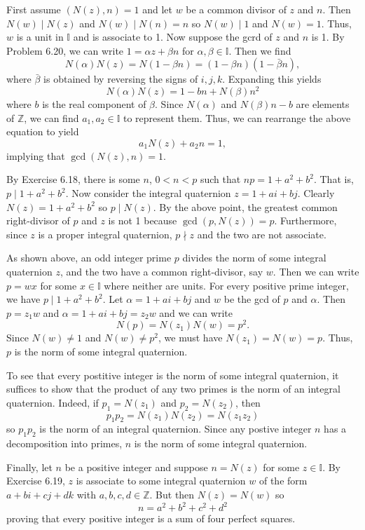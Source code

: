\documentclass[../../master.tex]{subfiles}
\begin{document}
\begin{solution}
    First assume $(N(z), n) = 1$ and let $w$ be a common divisor of $z$ and $n$.
    Then $N(w) \mid N(z)$ and $N(w) \mid N(n) = n$ so $N(w) \mid 1$ and $N(w) = 1$.
    Thus, $w$ is a unit in $\mathbb{I}$ and is associate to 1.
    Now suppose the gcrd of $z$ and $n$ is 1.
    By Problem 6.20, we can write $1 = \alpha z + \beta n$ for $\alpha, \beta \in \mathbb{I}$.
    Then we find
    \[
        N(\alpha) N(z) = N(1 - \beta n) = (1 - \beta n) (1 - \bar{\beta} n),
    \]
    where $\bar{\beta}$ is obtained by reversing the signs of $i, j, k$.
    Expanding this yields
    \[
        N(\alpha) N(z) = 1 - bn + N(\beta) n^2
    \]
    where $b$ is the real component of $\beta$.
    Since $N(\alpha)$ and $N(\beta) n - b$ are elements of $\mathbb{Z}$, we can find $a_1, a_2 \in \mathbb{I}$ to represent them.
    Thus, we can rearrange the above equation to yield
    \[
        a_1 N(z) + a_2 n = 1,
    \]
    implying that $\gcd(N(z), n) = 1$.

    By Exercise 6.18, there is some $n$, $0 < n < p$ such that $np = 1 + a^2 + b^2$.
    That is, $p \mid 1 + a^2 + b^2$.
    Now consider the integral quaternion $z = 1 + ai + bj$.
    Clearly $N(z) = 1 + a^2 + b^2$ so $p \mid N(z)$.
    By the above point, the greatest common right-divisor of $p$ and $z$ is not 1 because $\gcd(p, N(z)) = p$.
    Furthermore, since $z$ is a proper integral quaternion, $p \nmid z$ and the two are not associate.

    As shown above, an odd integer prime $p$ divides the norm of some integral quaternion $z$, and the two have a common right-divisor, say $w$.
    Then we can write $p = wx$ for some $x \in \mathbb{I}$ where neither are units.
    For every positive prime integer, we have $p \mid 1 + a^2 + b^2$.
    Let $\alpha = 1 + ai + bj$ and $w$ be the gcd of $p$ and $\alpha$.
    Then $p = z_1 w$ and $\alpha = 1 + ai + bj = z_2 w$ and we can write
    \[
        N(p) = N(z_1) N(w) = p^2.
    \]
    Since $N(w) \neq 1$ and $N(w) \neq p^2$, we must have $N(z_1) = N(w) = p$.
    Thus, $p$ is the norm of some integral quaternion.

    To see that every postitive integer is the norm of some integral quaternion, it suffices to show that the product of any two primes is the norm of an integral quaternion.
    Indeed, if $p_1 = N(z_1)$ and $p_2 = N(z_2)$, then
    \[
        p_1 p_2 = N(z_1) N(z_2) = N(z_1 z_2)
    \]
    so $p_1 p_2$ is the norm of an integral quaternion.
    Since any postive integer $n$ has a decomposition into primes, $n$ is the norm of some integral quaternion.

    Finally, let $n$ be a positive integer and suppose $n = N(z)$ for some $z \in \mathbb{I}$. 
    By Exercise 6.19, $z$ is associate to some integral quaternion $w$ of the form $a + bi + cj + dk$ with $a, b, c, d \in \mathbb{Z}$.
    But then $N(z) = N(w)$ so
    \[
    n = a^2 + b^2 + c^2 + d^2
    \]
    proving that every positive integer is a sum of four perfect squares.
\end{solution}
\end{document}
